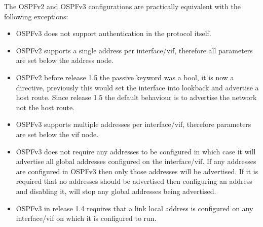 \noindent
The OSPFv2 and OSPFv3 configurations are practically equivalent with
the following exceptions:
\begin{itemize}
\item OSPFv3 does not support authentication in the protocol itself.
\item OSPFv2 supports a single address per interface/vif, therefore all
parameters are set below the address node.
\item OSPFv2 before release 1.5 the passive keyword was a bool, it is
now a directive, previously this would set the interface into lookback
and advertise a host route. Since release 1.5 the default behaviour is
to advertise the network not the host route.
\item OSPFv3 supports multiple addresses per interface/vif, therefore
parameters are set below the vif node.
\item OSPFv3 does not require any addresses to be configured in which
case it will advertise all global addresses configured on the
interface/vif. If any addresses are configured in OSPFv3 then only
those addresses will be advertised. If it is required that no
addresses should be advertised then configuring an address and
disabling it, will stop any global addresses being advertised.
\item OSPFv3 in release 1.4 requires that a link local address is
configured on any interface/vif on which it is configured to run.
\end{itemize}

